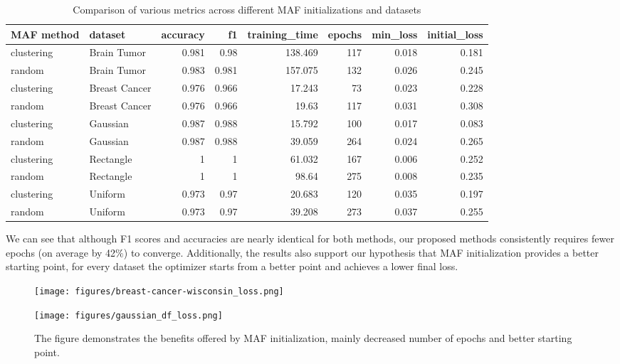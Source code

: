 \documentclass[10pt,a4paper,oneside]{article}
\begin{document}
\begin{table}[H]
    \centering
    \caption{Comparison of various metrics across different MAF initializations and datasets}
    \label{comparison}
    \begin{tabular}{l|l|r|r|r|r|r|r}
    \toprule
    MAF method & dataset & accuracy & f1 & training\_time & epochs & min\_loss & initial\_loss\\
    \midrule
    clustering & Brain Tumor & 0.981 & 0.98 & 138.469 & 117 & 0.018 & 0.181 \\
    random & Brain Tumor & 0.983 & 0.981 & 157.075 & 132 & 0.026 & 0.245 \\
    clustering & Breast Cancer & 0.976 & 0.966 & 17.243 & 73 & 0.023 & 0.228 \\
    random & Breast Cancer & 0.976 & 0.966 & 19.63 & 117 & 0.031 & 0.308 \\
    clustering & Gaussian & 0.987 & 0.988 & 15.792 & 100 & 0.017 & 0.083 \\
    random & Gaussian & 0.987 & 0.988 & 39.059 & 264 & 0.024 & 0.265 \\
    clustering & Rectangle & 1 & 1 & 61.032 & 167 & 0.006 & 0.252  \\
    random & Rectangle & 1 & 1 & 98.64 & 275 & 0.008 & 0.235 \\
    clustering & Uniform & 0.973 & 0.97 & 20.683 & 120 & 0.035 & 0.197  \\
    random & Uniform & 0.973 & 0.97 & 39.208 & 273 & 0.037 & 0.255 \\
        \bottomrule
    \end{tabular}
\end{table}

{\color{black}We can see that although F1 scores and accuracies are nearly identical for both methods, our proposed methods consistently requires fewer epochs (on average by 42$\%$) to converge. Additionally, the results also support our hypothesis that MAF initialization provides a better starting point, for every dataset the optimizer starts from a better point and achieves a lower final loss.}


\FloatBarrier

\begin{figure}[htbp]
    \centering
    \label{talbe-ratios}
    \begin{minipage}{0.49\textwidth}
        \texttt{[image: figures/breast-cancer-wisconsin\_loss.png]} %
    \end{minipage}\hfill
    \begin{minipage}{0.49\textwidth}
        \texttt{[image: figures/gaussian\_df\_loss.png]} %
    \end{minipage}
    \caption{The figure demonstrates the benefits offered by MAF initialization, mainly decreased number of epochs and better starting point.}
    \label{fig:side_by_side}
\end{figure}
\end{document}
